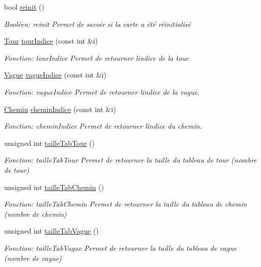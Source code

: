 \begin{DoxyCompactItemize}
bool \hyperlink{classCarte_a80741d7228490a91565f33977355da92}{reinit} ()
\begin{DoxyCompactList}\small\item\em Booléen\+: reinit Permet de savoir si la carte a été réinitialisé \end{DoxyCompactList}\item 
\hyperlink{classTour}{Tour} \hyperlink{classCarte_ae4eaa2ff8488218767a9f68232f066d4}{tour\+Indice} (const int \&i)
\begin{DoxyCompactList}\small\item\em Fonction\+: tour\+Indice Permet de retourner l\textquotesingle{}indice de la tour. \end{DoxyCompactList}\item 
\hyperlink{classVague}{Vague} \hyperlink{classCarte_a042044f8d54a0f85953a5f61a0d38c86}{vague\+Indice} (const int \&i)
\begin{DoxyCompactList}\small\item\em Fonction\+: vague\+Indice Permet de retourner l\textquotesingle{}indice de la vague. \end{DoxyCompactList}\item 
\hyperlink{classChemin}{Chemin} \hyperlink{classCarte_aaab8126dc81caed5a8e38772d84b60e4}{chemin\+Indice} (const int \&i)
\begin{DoxyCompactList}\small\item\em Fonction\+: chemin\+Indice Permet de retourner l\textquotesingle{}indice du chemin. \end{DoxyCompactList}\item 
unsigned int \hyperlink{classCarte_a34264cb9ab59c19b9bd7ad1eeae324b0}{taille\+Tab\+Tour} ()
\begin{DoxyCompactList}\small\item\em Fonction\+: taille\+Tab\+Tour Permet de retourner la taille du tableau de tour (nombre de tour) \end{DoxyCompactList}\item 
unsigned int \hyperlink{classCarte_aa55a81ad0d51af69b0a34dcc544b678d}{taille\+Tab\+Chemin} ()
\begin{DoxyCompactList}\small\item\em Fonction\+: taille\+Tab\+Chemin Permet de retourner la taille du tableau de chemin (nombre de chemin) \end{DoxyCompactList}\item 
unsigned int \hyperlink{classCarte_a17cf9a92bb7d81cf3279b50bb40b0891}{taille\+Tab\+Vague} ()
\begin{DoxyCompactList}\small\item\em Fonction\+: taille\+Tab\+Vague Permet de retourner la taille du tableau de vague (nombre de vague) \end{DoxyCompactList}\item 

\end{DoxyCompactItemize}
